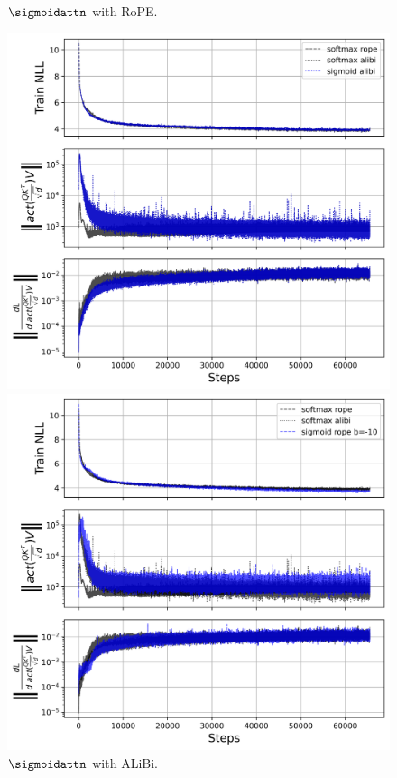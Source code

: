 \begin{figure}[htbp]
\begin{minipage}{0.48\textwidth}
        \captionsetup{justification=centering}
        \caption{$\sigmoidattn$ with RoPE.}
        \label{fig:rope_vs_rope}
    \end{minipage}
    \hfill
    \begin{minipage}{0.48\textwidth}
        \centering
        \includegraphics[width=\textwidth]{figures/attn_norm_seed1000001_softmax_rope_vs_softmax_alibi_vs_sigmoid_alibi.png}
        \captionsetup{justification=centering}
        \caption{$\sigmoidattn$ with ALiBi.}
        \label{fig:rope_vs_alibi}
    \end{minipage}\hfill
    \begin{minipage}{0.48\textwidth}
        \centering        
        \includegraphics[width=\textwidth]{figures/attn_norm_seed1000001_softmax_rope_vs_softmax_alibi_vs_sigmoid_rope_b=-10.png}

\end{minipage}
\end{figure}
